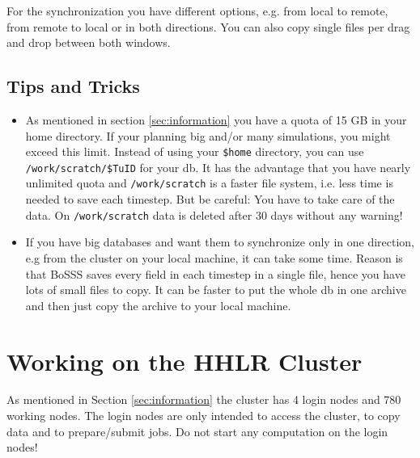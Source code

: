 \documentclass[11pt,twoside,a4paper]{fdyartcl}
\begin{document}
For the synchronization you have different options, e.g. from local to remote, from remote to local or in both directions.
You can also copy single files per drag and drop between both windows.

\subsection{Tips and Tricks}
\label{sec:tips}
\begin{itemize}
\item As mentioned in section \ref{sec:information} you have a quota of 15 GB in your home directory. If your planning big and/or many simulations, you might exceed this limit. Instead of using your \verb|$home| directory, you can use \verb|/work/scratch/$TuID| for your db. It has the advantage that you have nearly unlimited quota and \verb|/work/scratch| is a faster file system, i.e. less time is needed to save each timestep. But be careful: You have to take care of the data. On \verb|/work/scratch| data is deleted after 30 days without any warning!
\item If you have big databases and want them to synchronize only in one direction, e.g from the cluster on your local machine, it can take some time. Reason is that BoSSS saves every field in each timestep in a single file, hence you have lots of small files to copy. It can be faster to put the whole db in one archive and then just copy the archive to your local machine.
\end{itemize}


\section{Working on the HHLR Cluster}
\label{sec:WorkingHHLR}
As mentioned in Section \ref{sec:information} the cluster has 4 login nodes and 780 working nodes. The login nodes are only intended to access the cluster, to copy data and to prepare/submit jobs. Do not start any computation on the login nodes!
\end{document}
